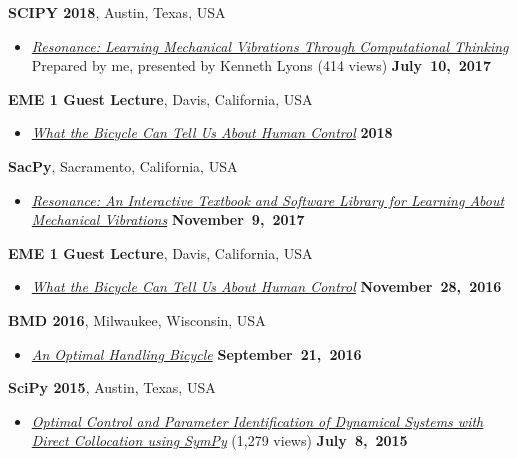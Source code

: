 \documentclass[10pt]{article}
\newenvironment{outerlist}[1][\enskip\textbullet]%
        {\begin{itemize}[#1]}{\end{itemize}%
         \vspace{-.6\baselineskip}}
\newcommand{\blankline}{\quad\pagebreak[2]}
\begin{document}
\blankline

\textbf{SCIPY 2018}, Austin, Texas, USA
\begin{outerlist}
\item[] \textit{\href{https://youtu.be/3QWKDGe528c}{Resonance: Learning
  Mechanical Vibrations Through Computational Thinking}} Prepared by me,
  presented by Kenneth Lyons (414 views)
    \hfill \textbf{July~10,~2017}
\end{outerlist}

\blankline

\textbf{EME 1 Guest Lecture}, Davis, California, USA
\begin{outerlist}
\item[]
  \href{http://www.moorepants.info/presentations/2018/EME001/#/}{\textit{What
    the Bicycle Can Tell Us About Human Control}}
    \hfill \textbf{2018}
\end{outerlist}

\blankline

\textbf{SacPy}, Sacramento, California, USA
\begin{outerlist}
\item[]
  \href{https://www.slideshare.net/moorepants/resonance-introduction-at-sacpy/1}{\textit{Resonance:
      An Interactive Textbook and Software Library for Learning About
      Mechanical Vibrations}}
    \hfill \textbf{November~9,~2017}
\end{outerlist}

\blankline

\textbf{EME 1 Guest Lecture}, Davis, California, USA
\begin{outerlist}
\item[]
  \href{http://www.moorepants.info/presentations/2016/EME001/#/}{\textit{What
    the Bicycle Can Tell Us About Human Control}}
    \hfill \textbf{November~28,~2016}
\end{outerlist}

\blankline

\textbf{BMD 2016}, Milwaukee, Wisconsin, USA
\begin{outerlist}
\item[]
  \href{http://www.moorepants.info/presentations/2016/BMD2016/}{\textit{
    An Optimal Handling Bicycle}}
    \hfill \textbf{September~21,~2016}
\end{outerlist}

\blankline

\textbf{SciPy 2015}, Austin, Texas, USA
\begin{outerlist}
\item[]
  \href{https://youtu.be/ZJiYs2HuQy8}{\textit{
    Optimal Control and Parameter Identification of Dynamical Systems with
Direct Collocation using SymPy}} (1,279 views)
    \hfill \textbf{July~8,~2015}
\end{outerlist}
\end{document}
